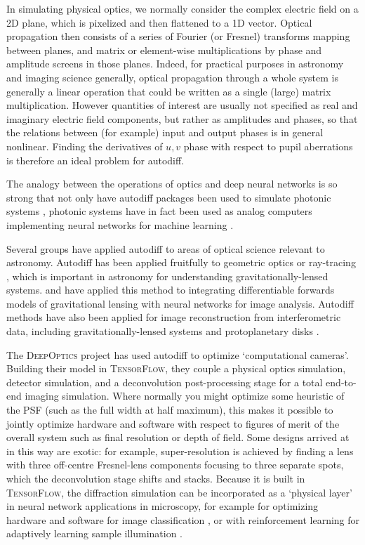 \documentclass[modern]{aastex63}
\begin{document}
In simulating physical optics, we normally consider the complex electric field on a 2D plane, which is pixelized and then flattened to a 1D vector.
Optical propagation then consists of a series of Fourier (or  Fresnel) transforms mapping between planes, and matrix or element-wise multiplications by phase and amplitude screens in those planes. Indeed, for practical purposes in astronomy and imaging science generally, optical propagation through a whole system is generally a linear operation that could be written as a single (large) matrix multiplication. However quantities of interest are usually not specified as real and imaginary electric field components, but rather as amplitudes and phases, so that the relations between (for example) input and output phases is in general nonlinear. Finding the derivatives of $u,v$ phase with respect to pupil aberrations is therefore an ideal problem for autodiff.

The analogy between the operations of optics and deep neural networks is so strong that not only have autodiff packages been used to simulate photonic systems \citep[e.g.][]{hughes18}, photonic systems have in fact been used as analog computers implementing neural networks for machine learning \citep{hughes19,guo19}. 

Several groups have applied autodiff to areas of optical science relevant to astronomy. Autodiff has been applied fruitfully to geometric optics or ray-tracing \citep[e.g.][]{werner2012,sutin16}, which is important in astronomy for understanding gravitationally-lensed systems. \citet{chianese19} and \citet{morningstar19} have applied this method to integrating differentiable forwards models of gravitational lensing with neural networks for image analysis. Autodiff methods have also been applied for image reconstruction from interferometric data, including gravitationally-lensed systems \citep{morningstar18} and protoplanetary disks \citep{czekala19}.

The \textsc{DeepOptics} project \citep{sitzmann2018} has used autodiff to optimize `computational cameras'. Building their model in \textsc{TensorFlow}, they couple a physical optics simulation, detector simulation, and a deconvolution post-processing stage for a total end-to-end imaging simulation. Where normally you might optimize some heuristic of the PSF (such as the full width at half maximum), this makes it possible to jointly optimize hardware and software with respect to figures of merit of the overall system such as final resolution or depth of field. Some designs arrived at in this way are exotic: for example, super-resolution is achieved by finding a lens with three off-centre Fresnel-lens components focusing to three separate spots, which the deconvolution stage shifts and stacks. Because it is built in \textsc{TensorFlow}, the diffraction simulation can be incorporated as a `physical layer' in neural network applications in microscopy, for example for optimizing hardware and software for image classification \citep{muthumbi19}, or with reinforcement learning for adaptively learning sample illumination \citet{chaware19}.
\end{document}
